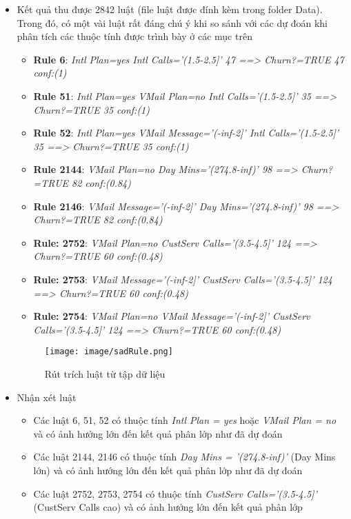 \documentclass[a4paper, 12pt]{article}
\begin{document}
\begin{itemize}
    \item Kết quả thu được 2842 luật (file luật được đính kèm trong folder Data). Trong đó, có một vài luật rất đáng chú ý khi so sánh với các dự đoán khi phân tích các thuộc tính được trình bày ở các mục trên
    \begin{itemize}
        \item \textbf{Rule 6}: \textit{Intl Plan=yes Intl Calls='(1.5-2.5]' 47 ==> Churn?=TRUE 47    conf:(1)}
        \item \textbf{Rule 51}: \textit{Intl Plan=yes VMail Plan=no Intl Calls='(1.5-2.5]' 35 ==> Churn?=TRUE 35    conf:(1)}
        \item \textbf{Rule 52}: \textit{Intl Plan=yes VMail Message='(-inf-2]' Intl Calls='(1.5-2.5]' 35 ==> Churn?=TRUE 35    conf:(1)}
        \item \textbf{Rule 2144}: \textit{VMail Plan=no Day Mins='(274.8-inf)' 98 ==> Churn?=TRUE 82    conf:(0.84)}
        \item \textbf{Rule 2146}: \textit{VMail Message='(-inf-2]' Day Mins='(274.8-inf)' 98 ==> Churn?=TRUE 82    conf:(0.84)}
        \item \textbf{Rule: 2752}: \textit{VMail Plan=no CustServ Calls='(3.5-4.5]' 124 ==> Churn?=TRUE 60    conf:(0.48)}
        \item \textbf{Rule: 2753}: \textit{VMail Message='(-inf-2]' CustServ Calls='(3.5-4.5]' 124 ==> Churn?=TRUE 60    conf:(0.48)}
        \item \textbf{Rule: 2754}: \textit{VMail Plan=no VMail Message='(-inf-2]' CustServ Calls='(3.5-4.5]' 124 ==> Churn?=TRUE 60    conf:(0.48)}
    \end{itemize}
    \begin{figure}[H]
        \begin{center}
            \texttt{[image: image/sadRule.png]}
            \caption{Rút trích luật từ tập dữ liệu}
        \end{center}
    \end{figure}

    \item Nhận xét luật 
    \begin{itemize}
        \item Các luật 6, 51, 52 có thuộc tính \textit{Intl Plan = yes} hoặc \textit{VMail Plan = no} và có ảnh hưởng lớn đến kết quả phân lớp như đã dự đoán
        \item Các luật 2144, 2146 có thuộc tính \textit{Day Mins = '(274.8-inf)'} (Day Mins lớn) và có ảnh hướng lớn đến kết quả phân lớp như đã dự đoán
        \item Các luật 2752, 2753, 2754 có thuộc tính \textit{CustServ Calls='(3.5-4.5]'} (CustServ Calls cao) và có ảnh hưởng lớn đến kết quả phân lớp
    \end{itemize}
\end{itemize}
\clearpage
\end{document}
